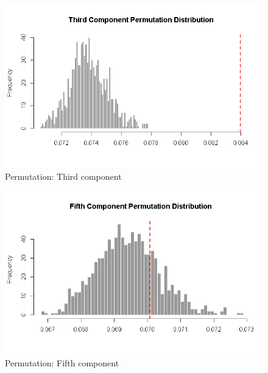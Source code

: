 \documentclass[
  ignorenonframetext,
]{beamer}
\begin{document}
\begin{frame}

\begin{figure}
\centering
\includegraphics{../Images/Perm3.png}
\caption{Permutation: Third component}
\end{figure}

\end{frame}

\begin{frame}

\begin{figure}
\centering
\includegraphics{../Images/Perm4.png}
\caption{Permutation: Fifth component}
\end{figure}

\end{frame}
\end{document}

